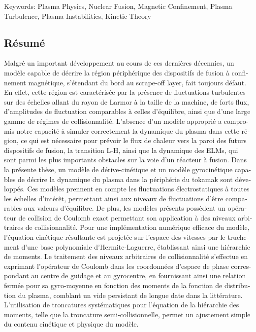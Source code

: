 \vskip0.5cm
Keywords: Plasma Physics, Nuclear Fusion, Magnetic Confinement, Plasma Turbulence, Plasma Instabilities, Kinetic Theory

\begin{otherlanguage}{portuguese}
\cleardoublepage
\chapter*{Résumé}

Malgré un important développement au cours de ces dernières décennies, un modèle capable de décrire la région périphérique des dispositifs de fusion à confinement magnétique, s'étendant du bord au scrape-off layer, fait toujours défaut.
%
En effet, cette région est caractérisée par la présence de fluctuations turbulentes sur des échelles allant du rayon de Larmor à la taille de la machine, de forts flux, d'amplitudes de fluctuation comparables à celles d'équilibre, ainsi que d'une large gamme de régimes de collisionnalité.
%
L’absence d’un modèle approprié a compromis notre capacité à simuler correctement la dynamique du plasma
dans cette région, ce qui est nécessaire pour prévoir le flux de chaleur vers la paroi des futurs dispositifs de fusion, la transition L-H, ainsi que la dynamique des ELMs, qui sont parmi les
plus importants obstacles sur la voie d’un réacteur à fusion.
%
Dans la présente thèse, un modèle de dérive-cinétique et un modèle gyrocinétique capables de décrire la dynamique du plasma dans la périphérie du tokamak sont développés.
%
Ces modèles prennent en compte les fluctuations électrostatiques à toutes les échelles d’intérêt, permettant ainsi aux niveaux de fluctuations d'être comparables aux valeurs d'équilibre.
%
De plus, les modèles présents possèdent un opérateur de collision de Coulomb exact permettant son application à des niveaux arbitraires de collisionnalité.
%
Pour une implémentation numérique efficace du modèle, l’équation cinétique résultante est projetée sur l’espace des vitesses par le truchement d'une base polynomiale d'Hermite-Laguerre, établissant ainsi une hiérarchie de moments.
%
Le traitement des niveaux arbitraires de collisionnalité s’effectue en exprimant l’opérateur de Coulomb dans les coordonnées d’espace de phase correspondant au centre de guidage et au gyrocentre, en fournissant ainsi une relation fermée pour sa gyro-moyenne en fonction des moments de la fonction de distribution du plasma, comblant un vide persistant de longue date dans la littérature.
%
L’utilisation de troncatures systématiques pour l’équation de la hiérarchie des moments, telle que la troncature semi-collisionnelle, permet un ajustement simple du contenu cinétique et physique du modèle.

\end{otherlanguage}
